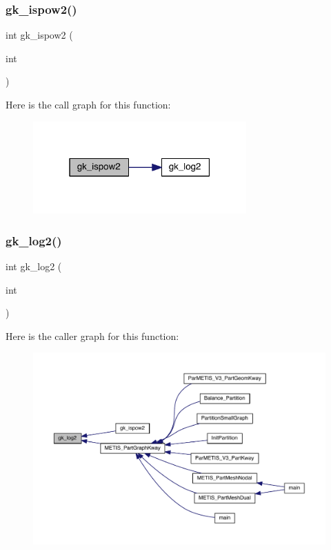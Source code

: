 \subsubsection{\texorpdfstring{gk\+\_\+ispow2()}{gk\_ispow2()}}
{\footnotesize\ttfamily int gk\+\_\+ispow2 (\begin{DoxyParamCaption}\item[{int}]{ }\end{DoxyParamCaption})}

Here is the call graph for this function\+:\nopagebreak
\begin{figure}[H]
\begin{center}
\leavevmode
\includegraphics[width=232pt]{a00077_a1758da0e2e1acd50b3506f06fd69cd37_cgraph}
\end{center}
\end{figure}
\mbox{\label{a00077_a3d153a0a39d7ba54f0943fa586f0c561}} 
\subsubsection{\texorpdfstring{gk\+\_\+log2()}{gk\_log2()}}
{\footnotesize\ttfamily int gk\+\_\+log2 (\begin{DoxyParamCaption}\item[{int}]{ }\end{DoxyParamCaption})}

Here is the caller graph for this function\+:\nopagebreak
\begin{figure}[H]
\begin{center}
\leavevmode
\includegraphics[width=350pt]{a00077_a3d153a0a39d7ba54f0943fa586f0c561_icgraph}
\end{center}
\end{figure}
\mbox{\label{a00077_aba6f76f5c67b9b7e9c2e45988d3d3e9d}} 
